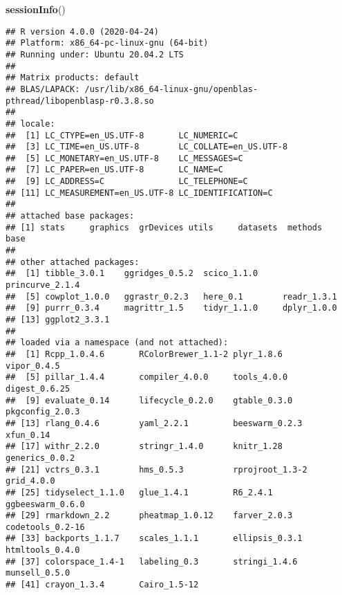 \documentclass[
]{article}
\newenvironment{Shaded}{\begin{snugshade}}{\end{snugshade}}
\newcommand{\KeywordTok}[1]{\textcolor[rgb]{0.13,0.29,0.53}{\textbf{#1}}}
\newcommand{\NormalTok}[1]{#1}
\begin{document}
\begin{Shaded}
\begin{Highlighting}[]
\KeywordTok{sessionInfo}\NormalTok{()}
\end{Highlighting}
\end{Shaded}

\begin{verbatim}
## R version 4.0.0 (2020-04-24)
## Platform: x86_64-pc-linux-gnu (64-bit)
## Running under: Ubuntu 20.04.2 LTS
## 
## Matrix products: default
## BLAS/LAPACK: /usr/lib/x86_64-linux-gnu/openblas-pthread/libopenblasp-r0.3.8.so
## 
## locale:
##  [1] LC_CTYPE=en_US.UTF-8       LC_NUMERIC=C              
##  [3] LC_TIME=en_US.UTF-8        LC_COLLATE=en_US.UTF-8    
##  [5] LC_MONETARY=en_US.UTF-8    LC_MESSAGES=C             
##  [7] LC_PAPER=en_US.UTF-8       LC_NAME=C                 
##  [9] LC_ADDRESS=C               LC_TELEPHONE=C            
## [11] LC_MEASUREMENT=en_US.UTF-8 LC_IDENTIFICATION=C       
## 
## attached base packages:
## [1] stats     graphics  grDevices utils     datasets  methods   base     
## 
## other attached packages:
##  [1] tibble_3.0.1    ggridges_0.5.2  scico_1.1.0     princurve_2.1.4
##  [5] cowplot_1.0.0   ggrastr_0.2.3   here_0.1        readr_1.3.1    
##  [9] purrr_0.3.4     magrittr_1.5    tidyr_1.1.0     dplyr_1.0.0    
## [13] ggplot2_3.3.1  
## 
## loaded via a namespace (and not attached):
##  [1] Rcpp_1.0.4.6       RColorBrewer_1.1-2 plyr_1.8.6         vipor_0.4.5       
##  [5] pillar_1.4.4       compiler_4.0.0     tools_4.0.0        digest_0.6.25     
##  [9] evaluate_0.14      lifecycle_0.2.0    gtable_0.3.0       pkgconfig_2.0.3   
## [13] rlang_0.4.6        yaml_2.2.1         beeswarm_0.2.3     xfun_0.14         
## [17] withr_2.2.0        stringr_1.4.0      knitr_1.28         generics_0.0.2    
## [21] vctrs_0.3.1        hms_0.5.3          rprojroot_1.3-2    grid_4.0.0        
## [25] tidyselect_1.1.0   glue_1.4.1         R6_2.4.1           ggbeeswarm_0.6.0  
## [29] rmarkdown_2.2      pheatmap_1.0.12    farver_2.0.3       codetools_0.2-16  
## [33] backports_1.1.7    scales_1.1.1       ellipsis_0.3.1     htmltools_0.4.0   
## [37] colorspace_1.4-1   labeling_0.3       stringi_1.4.6      munsell_0.5.0     
## [41] crayon_1.3.4       Cairo_1.5-12
\end{verbatim}
\end{document}
